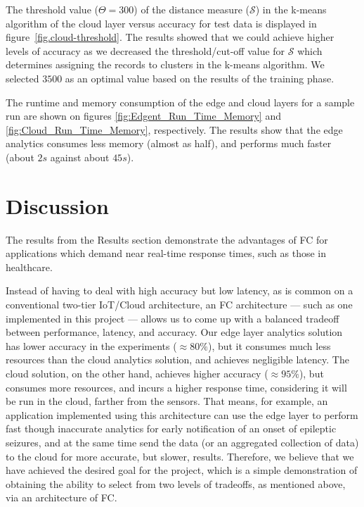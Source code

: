 \documentclass[letterpaper]{article}
\begin{document}
The threshold value (\(\Theta = 300\)) of the distance measure (\(\mathcal{S}\)) in the k-means algorithm of the cloud layer versus accuracy for test data is displayed in figure~\ref{fig.cloud-threshold}. The results showed that we could achieve higher levels of accuracy as we decreased the threshold/cut-off value for \(\mathcal{S}\) which determines assigning the records to clusters in the k-means algorithm. We selected \(3500\) as an optimal value based on the results of the training phase.

The runtime and memory consumption of the edge and cloud layers for a sample run are shown on figures \ref{fig:Edgent_Run_Time_Memory} and \ref{fig:Cloud_Run_Time_Memory}, respectively. The results show that the edge analytics consumes less memory (almost as half), and performs much faster (about \(2s\) against about \(45s\)).

\section{Discussion}

The results from the Results section demonstrate the advantages of FC for applications which demand near real-time response times, such as those in healthcare.

Instead of having to deal with high accuracy but low latency, as is common on a conventional two-tier IoT/Cloud architecture, an FC architecture --- such as one implemented in this project --- allows us to come up with a balanced tradeoff between performance, latency, and accuracy. Our edge layer analytics solution has lower accuracy in the experiments (\(\approx80\%\)), but it consumes much less resources than the cloud analytics solution, and achieves negligible latency. The cloud solution, on the other hand, achieves higher accuracy (\(\approx95\%\)), but consumes more resources, and incurs a higher response time, considering it will be run in the cloud, farther from the sensors. That means, for example, an application implemented using this architecture can use the edge layer to perform fast though inaccurate analytics for early notification of an onset of epileptic seizures, and at the same time send the data (or an aggregated collection of data) to the cloud for more accurate, but slower, results. Therefore, we believe that we have achieved the desired goal for the project, which is a simple demonstration of obtaining the ability to select from two levels of tradeoffs, as mentioned above, via an architecture of FC.
\end{document}
